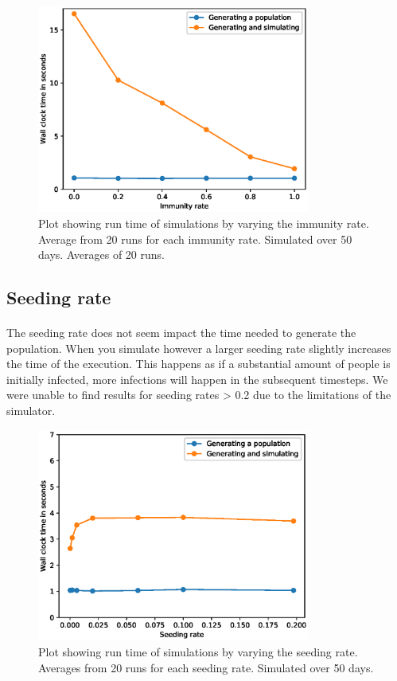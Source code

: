 \documentclass[runningheads]{llncs}
\begin{document}
\begin{figure}[h!]
\centering
	\includegraphics[width=0.8\textwidth]{3_Performance_Profiling/3_immunityrate.eps}
	\caption{Plot showing run time of simulations by varying the immunity rate.
			Average from 20 runs for each immunity rate. Simulated over 50 days.
	Averages of 20 runs.} 
	\label{Gprof_immunityrate}
\end{figure}

\subsection{Seeding rate}

\paragraph{} The seeding rate does not seem impact the time needed to generate the population. When you simulate however a larger seeding rate slightly increases the time of the execution. This happens as if a substantial amount of people is initially infected, more infections will happen in the subsequent timesteps.
We were unable to find results for seeding rates > 0.2 due to the limitations of the simulator.
\begin{figure}[h!]
\centering
	\includegraphics[width=0.8\textwidth]{3_Performance_Profiling/3_seedingrate.eps}
	\caption{Plot showing run time of simulations by varying the seeding rate.
	Averages from 20 runs for each seeding rate. Simulated over 50 days.} 
	\label{Gprof_seedingrate}
\end{figure}
\end{document}
